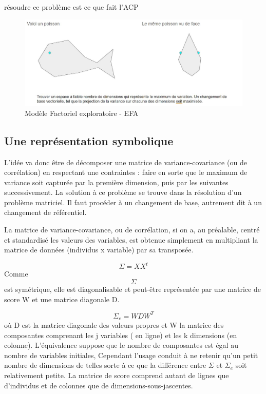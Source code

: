 \documentclass[
]{book}
\begin{document}
résoudre ce problème est ce que fait l'ACP

\begin{figure}
\centering
\includegraphics{./Images/ACp_poisson.jpg}
\caption{Modèle Factoriel exploratoire - EFA}
\end{figure}

\hypertarget{une-repruxe9sentation-symbolique}{%
\subsection{Une représentation symbolique}\label{une-repruxe9sentation-symbolique}}

L'idée va donc être de décomposer une matrice de variance-covariance (ou de corrélation) en respectant une contraintes : faire en sorte que le maximum de variance soit capturée par la première dimension, puis par les suivantes successivement. La solution à ce problème se trouve dans la résolution d'un problème matriciel. Il faut procéder à un changement de base, autrement dit à un changement de référentiel.

La matrice de variance-covariance, ou de corrélation, si on a, au préalable, centré et standardisé les valeurs des variables, est obtenue simplement en multipliant la matrice de données (individus x variable) par sa transposée.

\[
\Sigma = XX^t
\]
Comme \[\Sigma\] est symétrique, elle est diagonalisable et peut-être représentée par une matrice de score W et une matrice diagonale D.

\[
\Sigma_{e} =WDW^T
\]
où D est la matrice diagonale des valeurs propres et W la matrice des composantes comprenant les j variables ( en ligne) et les k dimensions (en colonne). L'équivalence suppose que le nombre de composantes est égal au nombre de variables initiales, Cependant l'usage conduit à ne retenir qu'un petit nombre de dimensions de telles sorte à ce que la différence entre \(\Sigma\) et \(\Sigma_{e}\) soit relativement petite. La matrice de score comprend autant de lignes que d'individus et de colonnes que de dimensions-sous-jascentes.
\end{document}
